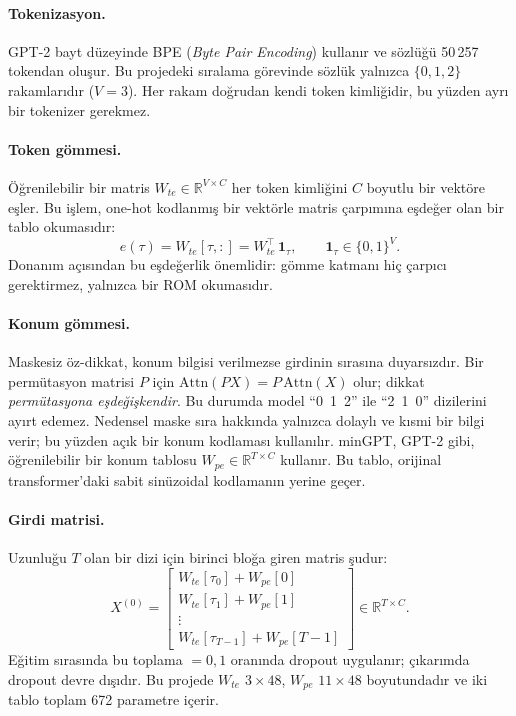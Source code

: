\paragraph{Tokenizasyon.} GPT-2 bayt düzeyinde BPE (\emph{Byte Pair Encoding}) kullanır ve sözlüğü 50\,257 tokendan oluşur. Bu projedeki sıralama görevinde sözlük yalnızca $\{0, 1, 2\}$ rakamlarıdır ($V=3$). Her rakam doğrudan kendi token kimliğidir, bu yüzden ayrı bir tokenizer gerekmez.

\paragraph{Token gömmesi.} Öğrenilebilir bir matris $W_{te} \in \mathbb{R}^{V\times C}$ her token kimliğini $C$ boyutlu bir vektöre eşler. Bu işlem, one-hot kodlanmış bir vektörle matris çarpımına eşdeğer olan bir tablo okumasıdır:
\begin{equation}
  e(\tau) = W_{te}[\tau,:] = W_{te}^{\top}\, \mathbf{1}_{\tau}, \qquad \mathbf{1}_{\tau} \in \{0,1\}^{V}.
\end{equation}
Donanım açısından bu eşdeğerlik önemlidir: gömme katmanı hiç çarpıcı gerektirmez, yalnızca bir ROM okumasıdır.

\paragraph{Konum gömmesi.} Maskesiz öz-dikkat, konum bilgisi verilmezse girdinin sırasına duyarsızdır. Bir permütasyon matrisi $P$ için $\mathrm{Attn}(PX) = P\,\mathrm{Attn}(X)$ olur; dikkat \emph{permütasyona eşdeğişkendir}. Bu durumda model ``0~1~2'' ile ``2~1~0'' dizilerini ayırt edemez. Nedensel maske sıra hakkında yalnızca dolaylı ve kısmi bir bilgi verir; bu yüzden açık bir konum kodlaması kullanılır. minGPT, GPT-2 gibi, öğrenilebilir bir konum tablosu $W_{pe} \in \mathbb{R}^{T\times C}$ kullanır. Bu tablo, orijinal transformer'daki sabit sinüzoidal kodlamanın yerine geçer.

\paragraph{Girdi matrisi.} Uzunluğu $T$ olan bir dizi için birinci bloğa giren matris şudur:
\begin{equation}
  X^{(0)} = \begin{bmatrix} W_{te}[\tau_0] + W_{pe}[0] \\ W_{te}[\tau_1] + W_{pe}[1] \\ \vdots \\ W_{te}[\tau_{T-1}] + W_{pe}[T-1] \end{bmatrix} \in \mathbb{R}^{T \times C}.
\end{equation}
Eğitim sırasında bu toplama  $=0{,}1$ oranında dropout uygulanır; çıkarımda dropout devre dışıdır. Bu projede $W_{te}$ $3\times48$, $W_{pe}$ $11\times48$ boyutundadır ve iki tablo toplam 672 parametre içerir.

